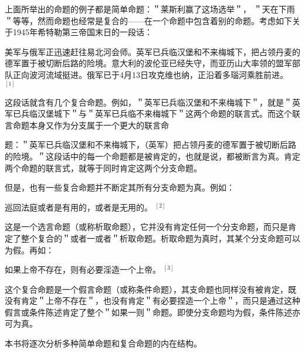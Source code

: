 上面所举出的命题的例子都是简单命题：＂莱斯利赢了这场选举＂， ＂天在下雨＂等等，然而命题也经常是复合的——在一个命题中包含着别的命题。考虑如下关于1945年希特勒第三帝国末日的一段话：

美军与俄军正迅速赶往易北河会师。英军已兵临汉堡和不来梅城下，把占领丹麦的德军置于被切断后路的险境。意大利的波伦亚已经失守，而亚历山大率领的盟军部队正向波河流域挺进。俄军已于4月13日攻克维也纳，正沿着多瑙河乘胜前进。 ${}^{[1]}$

这段话就含有几个复合命题。例如，＂英军已兵临汉堡和不来梅城下＂，就是＂英军已兵临汉堡城下＂与＂英军已兵临不来梅城下＂这两个命题的联言式。而这个联言命题本身又作为分支属于一个更大的联言命

题：＂英军已兵临汉堡和不来梅城下，（英军）把占领丹麦的德军置于被切断后路的险境。＂这段话中的每一个命题都是被肯定的，也就是说，都被断言为真。肯定两个命题的联言式，就等于同时肯定这两个分支命题。

但是，也有一些复合命题并不断定其所有分支命题为真。例如：

巡回法庭或者是有用的，或者是无用的。 ${}^{[2]}$

这是一个选言命题（或称析取命题），它并没有肯定任何一个分支命题，而只是肯定了整个复合的＂或者一或者＂析取命题。析取命题为真时，其某个分支命题可以为假。再如：

如果上帝不存在，则有必要淫造一个上帝。 ${ }^{[3]}$

这个复合命题是一个假言命题（或称条件命题），其支命题也同样没有被肯定，既没有肯定＂上帝不存在＂，也没有肯定＂有必要捏造一个上帝＂，而只是通过这种假言或条件陈述肯定了整个＂如果一则＂命题。即使分支命题均为假，条件陈述亦可为真。

本书将逐次分析多种简单命题和复合命题的内在结构。 